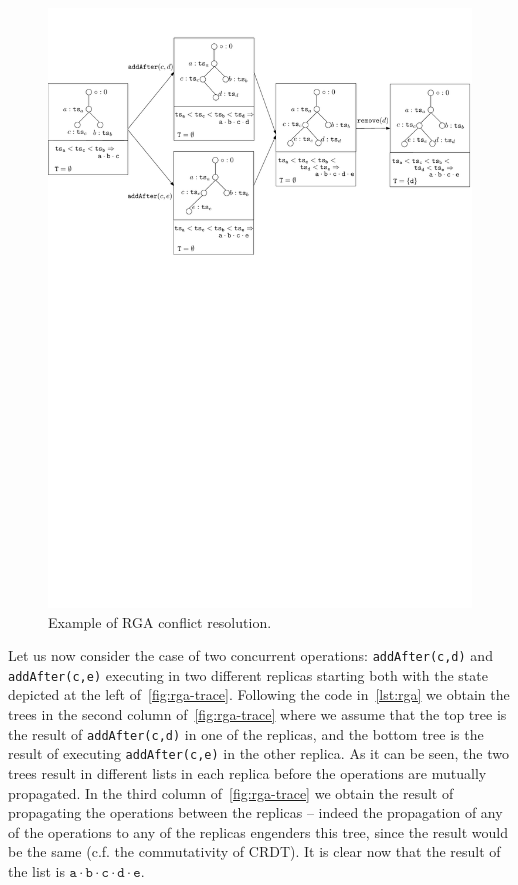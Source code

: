 \begin{figure}[t]
  \centering
  \includegraphics[width=1\textwidth]{figures/RGA-Trace}
  \caption{Example of RGA conflict resolution.}
  \label{fig:rga-trace}
\end{figure}

Let us now consider the case of two concurrent operations:
\lstinline|addAfter(c,d)| and \lstinline|addAfter(c,e)| executing in
two different replicas starting both with the state depicted at the
left of~\autoref{fig:rga-trace}.
%
Following the code in~\autoref{lst:rga} we obtain the trees in the
second column of~\autoref{fig:rga-trace} where we assume that the
top tree is the result of \lstinline|addAfter(c,d)| in one of the
replicas, and the bottom tree is the result of executing
\lstinline|addAfter(c,e)| in the other replica.
%
As it can be seen, the two trees result in different lists in each
replica before the operations are mutually propagated.
%
In the third column of~\autoref{fig:rga-trace} we obtain the
result of propagating the operations between the replicas -- indeed
the propagation of any of the operations to any of the replicas
engenders this tree, since the result would be the same (c.f. the
commutativity of CRDT).
%
It is clear now that the result of the list is $\mathtt{a \cdot b
  \cdot c \cdot d \cdot e}$.


